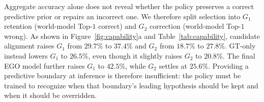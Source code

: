 \documentclass[letterpaper]{article}
\newcommand{\obs}[1]{\textcolor{measuredblue}{#1}}
\newcommand{\method}{\textsc{EGO}}
\begin{document}
Aggregate accuracy alone does not reveal whether the policy preserves a
correct predictive prior or repairs an incorrect one.  We therefore split
selection into $G_1$ retention (world-model Top-\obs{$1$} correct) and $G_2$
correction (world-model Top-\obs{$1$} wrong).  As shown in
Figure~\ref{fig:capability}a and Table~\ref{tab:capability}, candidate alignment
raises $G_1$ from \obs{$29.7\%$} to \obs{$37.4\%$} and $G_2$ from
\obs{$18.7\%$} to \obs{$27.8\%$}.  GT-only instead lowers $G_1$ to
\obs{$26.5\%$}, even though it slightly raises $G_2$ to \obs{$20.8\%$}.
The final \method{} model further raises $G_1$ to \obs{$42.5\%$},
while $G_2$ settles at \obs{$25.6\%$}.
Providing a predictive boundary at inference is therefore insufficient:
the policy must be trained to recognize when that boundary's leading
hypothesis should be kept and when it should be overridden.
\end{document}
